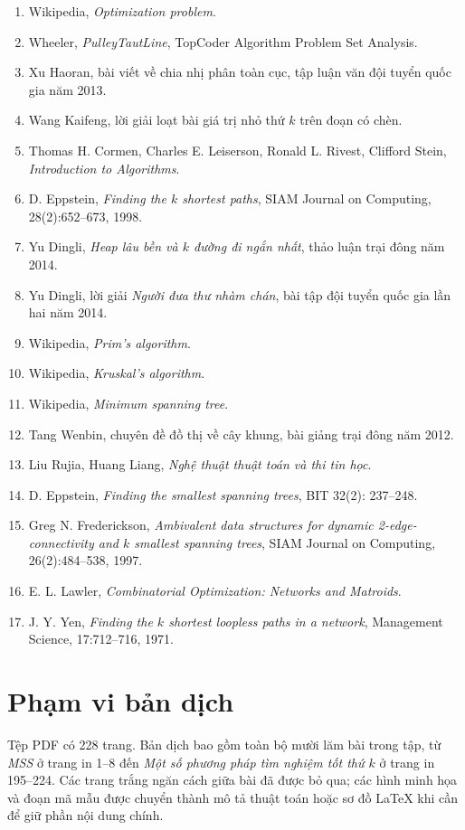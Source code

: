 \documentclass[11pt]{article}
\begin{document}
\begin{enumerate}
  \item Wikipedia, \emph{Optimization problem}.
  \item Wheeler, \emph{PulleyTautLine}, TopCoder Algorithm Problem Set Analysis.
  \item Xu Haoran, bài viết về chia nhị phân toàn cục, tập luận văn đội tuyển
  quốc gia năm 2013.
  \item Wang Kaifeng, lời giải loạt bài giá trị nhỏ thứ \(k\) trên đoạn có chèn.
  \item Thomas H. Cormen, Charles E. Leiserson, Ronald L. Rivest, Clifford
  Stein, \emph{Introduction to Algorithms}.
  \item D. Eppstein, \emph{Finding the \(k\) shortest paths}, SIAM Journal on
  Computing, 28(2):652--673, 1998.
  \item Yu Dingli, \emph{Heap lâu bền và \(k\) đường đi ngắn nhất}, thảo luận
  trại đông năm 2014.
  \item Yu Dingli, lời giải \emph{Người đưa thư nhàm chán}, bài tập đội tuyển
  quốc gia lần hai năm 2014.
  \item Wikipedia, \emph{Prim's algorithm}.
  \item Wikipedia, \emph{Kruskal's algorithm}.
  \item Wikipedia, \emph{Minimum spanning tree}.
  \item Tang Wenbin, chuyên đề đồ thị về cây khung, bài giảng trại đông năm
  2012.
  \item Liu Rujia, Huang Liang, \emph{Nghệ thuật thuật toán và thi tin học}.
  \item D. Eppstein, \emph{Finding the smallest spanning trees}, BIT 32(2):
  237--248.
  \item Greg N. Frederickson, \emph{Ambivalent data structures for dynamic
  2-edge-connectivity and \(k\) smallest spanning trees}, SIAM Journal on
  Computing, 26(2):484--538, 1997.
  \item E. L. Lawler, \emph{Combinatorial Optimization: Networks and Matroids}.
  \item J. Y. Yen, \emph{Finding the \(k\) shortest loopless paths in a
  network}, Management Science, 17:712--716, 1971.
\end{enumerate}

\section*{Phạm vi bản dịch}

Tệp PDF có 228 trang. Bản dịch bao gồm toàn bộ mười lăm bài trong tập, từ
\emph{MSS} ở trang in 1--8 đến \emph{Một số phương pháp tìm nghiệm tốt thứ
\(k\)} ở trang in 195--224. Các trang trắng ngăn cách giữa bài đã được bỏ qua;
các hình minh họa và đoạn mã mẫu được chuyển thành mô tả thuật toán hoặc sơ đồ
LaTeX khi cần để giữ phần nội dung chính.
\end{document}
